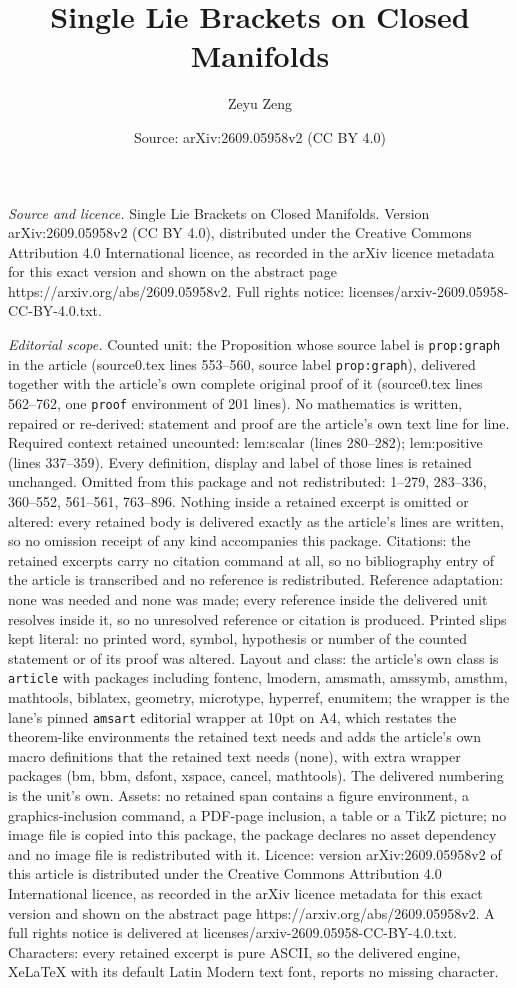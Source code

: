 \documentclass[10pt,a4paper]{amsart}
\title[Single Lie Brackets on Closed Manifolds]{Single Lie Brackets on Closed Manifolds}
\author{Zeyu Zeng}
\date{Source: arXiv:2609.05958v2 (CC BY 4.0)}
\begin{document}
\maketitle

\noindent\emph{Source and licence.} Single Lie Brackets on Closed Manifolds. Version arXiv:2609.05958v2 (CC BY 4.0), distributed under the Creative Commons Attribution 4.0 International licence, as recorded in the arXiv licence metadata for this exact version and shown on the abstract page https://arxiv.org/abs/2609.05958v2. Full rights notice: licenses/arxiv-2609.05958-CC-BY-4.0.txt.\par\smallskip

\noindent\textit{Editorial scope.} Counted unit: the Proposition whose source label is \texttt{prop:graph} in the article (source0.tex lines 553--560, source label \texttt{prop:graph}), delivered together with the article's own complete original proof of it (source0.tex lines 562--762, one \texttt{proof} environment of 201 lines). No mathematics is written, repaired or re-derived: statement and proof are the article's own text line for line. Required context retained uncounted: lem:scalar (lines 280--282); lem:positive (lines 337--359). Every definition, display and label of those lines is retained unchanged. Omitted from this package and not redistributed: 1--279, 283--336, 360--552, 561--561, 763--896. Nothing inside a retained excerpt is omitted or altered: every retained body is delivered exactly as the article's lines are written, so no omission receipt of any kind accompanies this package. Citations: the retained excerpts carry no citation command at all, so no bibliography entry of the article is transcribed and no reference is redistributed. Reference adaptation: none was needed and none was made; every reference inside the delivered unit resolves inside it, so no unresolved reference or citation is produced. Printed slips kept literal: no printed word, symbol, hypothesis or number of the counted statement or of its proof was altered. Layout and class: the article's own class is \texttt{article} with packages including fontenc, lmodern, amsmath, amssymb, amsthm, mathtools, biblatex, geometry, microtype, hyperref, enumitem; the wrapper is the lane's pinned \texttt{amsart} editorial wrapper at 10pt on A4, which restates the theorem-like environments the retained text needs and adds the article's own macro definitions that the retained text needs (none), with extra wrapper packages (bm, bbm, dsfont, xspace, cancel, mathtools). The delivered numbering is the unit's own. Assets: no retained span contains a figure environment, a graphics-inclusion command, a PDF-page inclusion, a table or a TikZ picture; no image file is copied into this package, the package declares no asset dependency and no image file is redistributed with it. Licence: version arXiv:2609.05958v2 of this article is distributed under the Creative Commons Attribution 4.0 International licence, as recorded in the arXiv licence metadata for this exact version and shown on the abstract page https://arxiv.org/abs/2609.05958v2. A full rights notice is delivered at licenses/arxiv-2609.05958-CC-BY-4.0.txt. Characters: every retained excerpt is pure ASCII, so the delivered engine, XeLaTeX with its default Latin Modern text font, reports no missing character.
\end{document}
